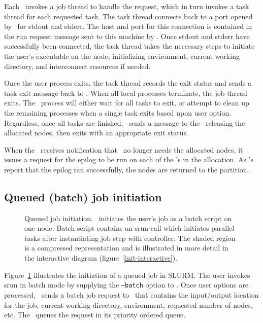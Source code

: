 Each \slurmd\ invokes a job thread to handle the request, which in turn
invokes a task thread for each requested task. The task thread connects
back to a port opened by \srun\ for stdout and stderr. The host and
port for this connection is contained in the run request message sent
to this machine by \srun . Once stdout and stderr have successfully 
been connected, the task thread takes the necessary steps to initiate 
the user's executable on the node, initializing environment, current
working directory, and interconnect resources if needed. 

Once the user process exits, the task thread records the exit status and
sends a task exit message back to \srun . When all local processes
terminate, the job thread exits. The \srun\ process will either wait
for all tasks to exit, or attempt to clean up the remaining processes
when a single task exits based upon user option. Regardless, once all
tasks are finished, \srun\ sends a message to the \slurmctld\ releasing
the allocated nodes, then exits with an appropriate exit status.

When the \slurmctld\ receives notification that \srun\ no longer needs
the allocated nodes, it issues a request for the epilog to be run on each of
the \slurmd 's in the allocation. As \slurmd 's report that the epilog ran
successfully, the nodes are returned to the partition.

\subsection{Queued (batch) job initiation}

\begin{figure}[tb]
\centerline{ }
\caption{\small Queued job initiation. 
         \slurmctld\ initiates the user's job as a batch script on one node. 
	 Batch script contains an srun call which initiates parallel tasks 
	 after instantiating job step with controller. The shaded region is 
	 a compressed representation and is illustrated in more detail in the 
	 interactive diagram (figure~\ref{init-interactive}).}
\label{init-batch}
\end{figure}

Figure~\ref{init-batch} illustrates the initiation of a queued job in SLURM.
The user invokes srun in batch mode by supplying the {\tt --batch} option 
to \srun . Once user options are processed, \srun\ sends a batch job request
to \slurmctld\ that contains the input/output location for the job, current
working directory, environment, requested number of nodes, etc. The 
\slurmctld\ queues the request in its priority ordered queue. 

